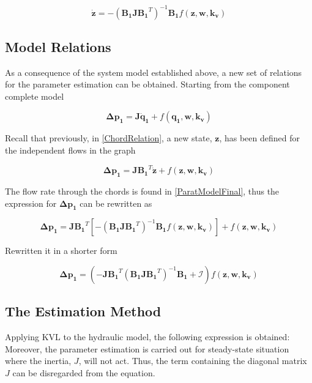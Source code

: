 \begin{equation}
   \pmb{\dot{z}}  = - (\pmb{B_1 J {B_1}}^T)^{-1}\pmb{B_1} f(\pmb{z},\pmb{ w}, \pmb{k_v})
   \label{ParatModelFinal}
 \end{equation}

\subsection{Model Relations}
\label{ModelRelationSection}

As a consequence of the system model established above, a new set of relations for the parameter estimation can be 
obtained. Starting from the component complete model

\begin{equation}
  \pmb{\Delta p_1} =  \pmb{J} \pmb{\dot{q}_1} + f(\pmb{q_1}, \pmb{w}, \pmb{k_v})
  \label{RecallModel}
\end{equation}

Recall that previously, in \eqref{ChordRelation}, a new state, $\pmb{z}$, has been defined for the independent flows in 
the graph

\begin{equation}
  \pmb{\Delta p_1} =  \pmb{J {B_1}}^T \pmb{\dot{z}} + f(\pmb{z}, \pmb{w}, \pmb{k_v})
 \end{equation}

The flow rate through the chords is found in \eqref{ParatModelFinal}, thus the expression for $ \pmb{\Delta p_1} $ can be rewritten as

\begin{equation}
 \pmb{ \Delta p_1} = \pmb{ J {B_1}}^T [- (\pmb{B_1 J {B_1}}^T)^{-1}\pmb{B_1} f(\pmb{z},\pmb{ w}, \pmb{k_v})] + f(\pmb{z},\pmb{ w}, \pmb{k_v})
  \label{PressureLarge}
 \end{equation}
 
 Rewritten it in a shorter form
 
 \begin{equation}
  \pmb{\Delta p_1} =  (-\pmb{J {B_1}}^T (\pmb{B_1 J {B_1}}^T)^{-1}\pmb{B_1} + \pmb{\mathcal{I}}) f(\pmb{z}, \pmb{w}, \pmb{k_v})
  \label{PressureShort}
 \end{equation}

\subsection{The Estimation Method}
\label{SubSecEstimation}

Applying KVL to the hydraulic model, the following expression is obtained: Moreover, the parameter estimation is carried out for steady-state 
situation where the inertia, $J$, will not act. Thus, the term containing the diagonal matrix $J$ can be disregarded from the equation. 

